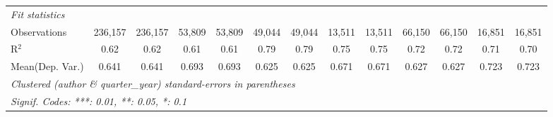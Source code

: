 \begin{tabular}{lcccccccccccc}
   \midrule
   \emph{Fit statistics}\\
   Observations                             & 236,157       & 236,157      & 53,809      & 53,809  & 49,044       & 49,044         & 13,511  & 13,511        & 66,150        & 66,150        & 16,851       & 16,851\\  
   R$^2$                                    & 0.62          & 0.62         & 0.61        & 0.61    & 0.79         & 0.79           & 0.75    & 0.75          & 0.72          & 0.72          & 0.71         & 0.70\\  
Mean(Dep. Var.) & 0.641 & 0.641 & 0.693 & 0.693 & 0.625 & 0.625 & 0.671 & 0.671 & 0.627 & 0.627 & 0.723 & 0.723 \\
   \midrule \midrule
   \multicolumn{13}{l}{\emph{Clustered (author \& quarter\_year) standard-errors in parentheses}}\\
   \multicolumn{13}{l}{\emph{Signif. Codes: ***: 0.01, **: 0.05, *: 0.1}}\\
\end{tabular}
\par\endgroup
